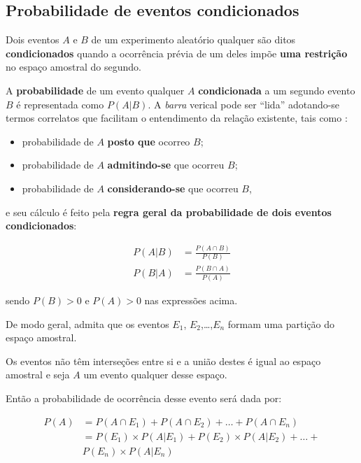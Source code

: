 \documentclass[
]{book}
\providecommand{\tightlist}{%
  \setlength{\itemsep}{0pt}\setlength{\parskip}{0pt}}
\begin{document}
\hypertarget{probabilidade-de-eventos-condicionados}{%
\subsection{Probabilidade de eventos condicionados}\label{probabilidade-de-eventos-condicionados}}

\hfill\break

Dois eventos \(A\) e \(B\) de um experimento aleatório qualquer são ditos \textbf{condicionados} quando a ocorrência prévia de um deles impõe \textbf{uma restrição} no espaço amostral do segundo.

A \textbf{probabilidade} de um evento qualquer \(A\) \textbf{condicionada} a um segundo evento \(B\) é representada como \(P(A|B)\). A \emph{barra} verical pode ser ``lida'' adotando-se termos correlatos que facilitam o entendimento da relação existente, tais como :

\begin{itemize}
\tightlist
\item
  probabilidade de \(A\) \textbf{posto que} ocorreo \(B\);
\item
  probabilidade de \(A\) \textbf{admitindo-se} que ocorreu \(B\);
\item
  probabilidade de \(A\) \textbf{considerando-se} que ocorreu \(B\),
\end{itemize}

e seu cálculo é feito pela \textbf{regra geral da probabilidade de dois eventos condicionados}:

\begin{align*}
P(A|B) & = \frac{ P(A\cap B)}{ P(B)} \\
P(B|A) & = \frac{ P(B\cap A)}{ P(A)}
\end{align*}

sendo \(P(B)>0\) e \(P(A)>0\) nas expressões acima.

De modo geral, admita que os eventos \(E_{1}\), \(E_{2}\),\ldots,\(E_{n}\) formam uma partição do espaço amostral.

Os eventos não têm interseções entre si e a união destes é igual ao espaço amostral e seja \(A\) um evento qualquer desse espaço.

Então a probabilidade de ocorrência desse evento será dada por:

\begin{align*}
P(A) & = P(A \cap E_{1}) +  P(A \cap E_{2}) + \dots + P(A \cap E_{n}) \\
     & = P(E_{1}) \times P(A|E_{1}) + P(E_{2}) \times P(A|E_{2}) + \dots + \\
     & P(E_{n}) \times P(A|E_{n})\\
\end{align*}
\end{document}
